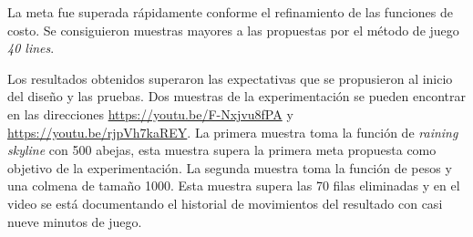 La meta fue superada rápidamente conforme el refinamiento de las funciones 
de costo. Se consiguieron muestras mayores a las propuestas por el método 
de juego \textit{40 lines}. 

Los resultados obtenidos superaron las expectativas que se propusieron al inicio 
del diseño y las pruebas. Dos muestras de la experimentación se pueden encontrar 
en las direcciones \url{https://youtu.be/F-Nxjvu8fPA} y 
\url{https://youtu.be/rjpVh7kaREY}. La primera muestra toma la función de 
\emph{raining skyline} con 500 abejas, esta muestra supera la primera meta propuesta 
como objetivo de la experimentación. La segunda muestra toma la función de pesos 
y una colmena de tamaño 1000. Esta muestra supera las 70 filas eliminadas y en el 
video se está documentando el historial de movimientos del resultado 
con casi nueve minutos de juego.

